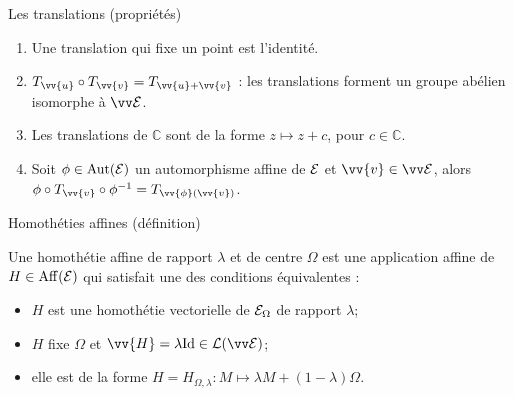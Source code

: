 \documentclass[bigger]{m53beamer}
\begin{document}
  \begin{frame}{Les translations (propriétés)}
    \begin{enumerate}[<+(1)->]
      \item Une translation qui fixe un point est l'identité.
      \item $T_{\vv{u}}\circ T_{\vv{v}} = T_{\vv{u}+\vv{v}}$ : les translations forment un groupe abélien isomorphe à $\ev{E}$.
      \item Les translations de $\mathbb{C}$ sont de la forme $z \mapsto z+c$, pour $c \in \mathbb{C}$.
      \item Soit $\phi \in \operatorname{Aut}(\mathcal{E})$ un automorphisme affine de $\mathcal{E}$ et $\vv{v} \in \ev{E}$, alors $\phi\circ T_{\vv{v}}\circ\phi^{-1}=T_{\vv{\phi}(\vv{v})}$.
    \end{enumerate}
  \end{frame}
  \begin{frame}{Homothéties affines (définition)}
    \begin{defprop}
      Une \alert{homothétie affine de rapport $\lambda$ et de centre $\Omega$} est une application affine de $H \in\operatorname{Aff}(\mathcal{E})$ qui satisfait une des conditions équivalentes :
      \begin{itemize}[<+(1)->]
        \item $H$ est une homothétie vectorielle de $\mathcal{E}_{\Omega}$ de rapport $\lambda$;
        \item $H$ fixe $\Omega$ et $\vv{H}=\lambda\id \in \lin(\ev{E})$;
        \item elle est de la forme $H=H_{\Omega,\lambda}:M \mapsto \lambda M + (1- \lambda)\Omega$.
      \end{itemize}
    \end{defprop}
  \end{frame}
\end{document}

